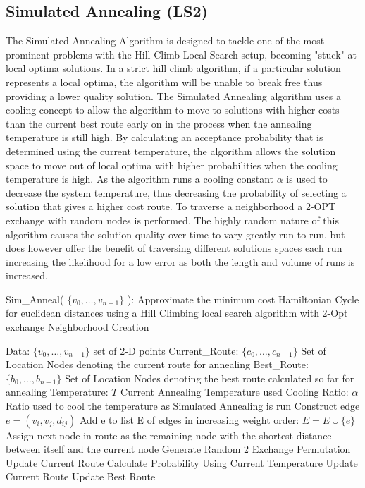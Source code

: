 \documentclass[format=sigconf]{acmart}
\begin{document}
\subsection{ Simulated Annealing (LS2)}
The Simulated Annealing Algorithm is designed to tackle one of the most prominent problems with the Hill Climb Local Search setup, becoming "stuck" at local optima solutions.
In a strict hill climb algorithm, if a particular solution represents a local optima, the algorithm will be unable to break free thus providing a lower quality solution. The Simulated Annealing 
algorithm uses a cooling concept to allow the algorithm to move to solutions with higher costs than the current best route early on in the process when the annealing temperature is still high. By calculating 
an acceptance probability that is determined using the current temperature, the algorithm allows the solution space to move out of local optima with higher probabilities when the cooling temperature is high. 
As the algorithm runs a cooling constant $\alpha$ is used to decrease the system temperature, thus decreasing the probability of selecting a solution that gives a higher cost route. To traverse a neighborhood a 2-OPT exchange 
with random nodes is performed. The highly random nature of this algorithm causes the solution quality over time to vary greatly run to run, but does however offer the benefit of traversing different solutions spaces each run increasing 
the likelihood for a low error as both the length and volume of runs is increased.
\begin{algorithm}[H] 
	\caption{  Sim\_Anneal( $\{v_0, \hdots, v_{n-1}\}$ ): Approximate the minimum cost Hamiltonian Cycle for euclidean distances using a Hill Climbing local search algorithm with 2-Opt exchange Neighborhood Creation}
	\begin{algorithmic} 
		\STATE Data: $\{v_0, \hdots, v_{n-1}\}$ set of 2-D points
		\STATE Current\_Route: $\{c_0, \hdots, c_{n-1}\}$ Set of Location Nodes denoting the current route for annealing
		\STATE Best\_Route: $\{b_0, \hdots, b_{n-1}\}$ Set of Location Nodes denoting the best route calculated so far for annealing
		\STATE Temperature: $T$ Current Annealing Temperature used
		\STATE Cooling Ratio: $\alpha$ Ratio used to cool the temperature as Simulated Annealing is run
			\STATE Construct edge $e = (v_i, v_j, d_{ij})$
			\STATE Add e to list E of edges in increasing weight order: $E = E \cup \{e\}$
		\ENDFOR
			\STATE Assign next node in route as the remaining node with the shortest distance between itself and the current node
		\ENDWHILE
			\STATE Generate Random 2 Exchange Permutation
				\STATE Update Current Route
			\ELSE
				\STATE Calculate Probability Using Current Temperature
					\STATE Update Current Route
				\ENDIF
			\ENDIF
				\STATE Update Best Route
			\ENDIF
		\ENDWHILE
	\end{algorithmic}
\end{algorithm}
\newpage
\end{document}
